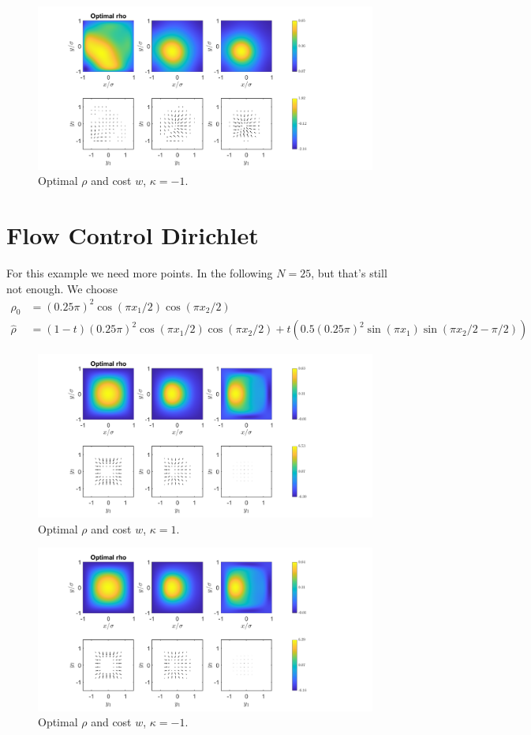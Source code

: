 \documentclass[11pt, a4paper]{article}
\theoremstyle{definition}
\newcommand{\hr}{\widehat \rho}
\begin{document}
	\begin{figure}[h]
		\centering
		\includegraphics[scale=0.35]{FCEx2kn1.png}
		\caption{Optimal $\rho$ and cost $w$, $\kappa = - 1$.} 
		\label{F3b}
	\end{figure}
	\section*{Flow Control Dirichlet}
	
	For this example we need more points. In the following $N = 25$, but that's still not enough. 
	We choose 
	\begin{align*}
		\rho_0 &= (0.25\pi)^2\cos(\pi x_1/2)\cos(\pi x_2/2)\\
		\hr &= (1 - t)(0.25\pi)^2\cos(\pi x_1/2)\cos(\pi x_2/2) + t(0.5(0.25\pi)^2\sin(\pi x_1)\sin(\pi x_2/2 - \pi/2))
	\end{align*}
	\begin{figure}[h]
		\centering
		\includegraphics[scale=0.35]{FCEx1k1.png}
		\caption{Optimal $\rho$ and cost $w$, $\kappa = 1$.} 
		\label{F4}
	\end{figure}
	\begin{figure}[h]
		\centering
		\includegraphics[scale=0.35]{FCEx1kn1.png}
		\caption{Optimal $\rho$ and cost $w$, $\kappa = - 1$.} 
		\label{F4a}
	\end{figure}
	
\end{document}
